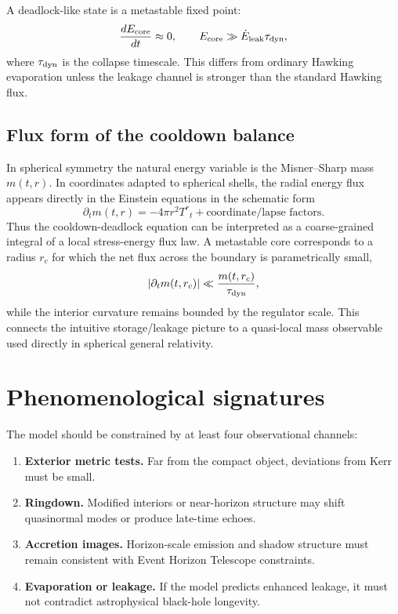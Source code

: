 \documentclass[11pt]{article}
\theoremstyle{remark}
\begin{document}
A deadlock-like state is a metastable fixed point:
\begin{equation}
    \frac{dE_{\rm core}}{dt}\approx 0,
    \qquad
    E_{\rm core}\gg \dot E_{\rm leak}\tau_{\rm dyn},
\end{equation}
where $\tau_{\rm dyn}$ is the collapse timescale. This differs from ordinary Hawking evaporation unless the leakage channel is stronger than the standard Hawking flux.


\subsection{Flux form of the cooldown balance}
In spherical symmetry the natural energy variable is the Misner--Sharp mass $m(t,r)$. In coordinates adapted to spherical shells, the radial energy flux appears directly in the Einstein equations in the schematic form
\begin{equation}
 \partial_t m(t,r)=-4\pi r^2 T^{r}{}_{t}+\text{coordinate/lapse factors}.
 \label{eq:reg-misner-sharp-flux}
\end{equation}
Thus the cooldown-deadlock equation can be interpreted as a coarse-grained integral of a local stress-energy flux law. A metastable core corresponds to a radius $r_c$ for which the net flux across the boundary is parametrically small,
\begin{equation}
 |\partial_t m(t,r_c)|\ll \frac{m(t,r_c)}{\tau_{\rm dyn}},
 \label{eq:reg-metastable-flux}
\end{equation}
while the interior curvature remains bounded by the regulator scale. This connects the intuitive storage/leakage picture to a quasi-local mass observable used directly in spherical general relativity.


\section{Phenomenological signatures}
The model should be constrained by at least four observational channels:
\begin{enumerate}[leftmargin=2em]
    \item \textbf{Exterior metric tests.} Far from the compact object, deviations from Kerr must be small.
    \item \textbf{Ringdown.} Modified interiors or near-horizon structure may shift quasinormal modes or produce late-time echoes.
    \item \textbf{Accretion images.} Horizon-scale emission and shadow structure must remain consistent with Event Horizon Telescope constraints.
    \item \textbf{Evaporation or leakage.} If the model predicts enhanced leakage, it must not contradict astrophysical black-hole longevity.
\end{enumerate}
\end{document}
